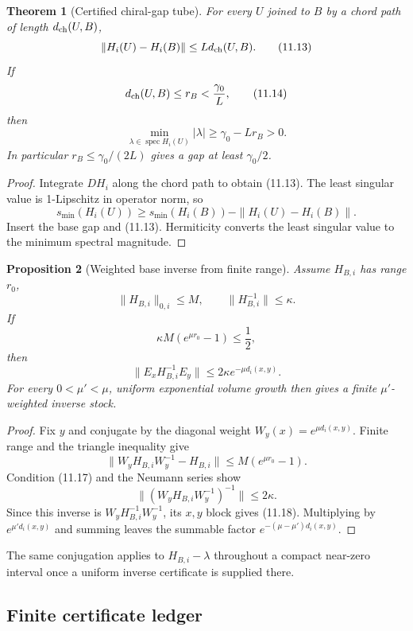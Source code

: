 \documentclass[11pt]{article}
\newtheorem{theorem}{Theorem}[section]
\newtheorem{proposition}[theorem]{Proposition}
\newcommand{\spec}{\operatorname{spec}}
\begin{document}
\begin{theorem}[Certified chiral-gap tube]
\label{thm:v11v11-certified-tube}
For every \(U\) joined to \(B\) by a chord path of length
\(d_{\rm ch}(U,B)\),
\[
 \|H_i(U)-H_i(B)\|
 \leq Ld_{\rm ch}(U,B).
 \tag{11.13}
\]
If
\[
 d_{\rm ch}(U,B)\leq r_B<\frac{\gamma_0}{L},
 \tag{11.14}
\]
then
\[
 \min_{\lambda\in\spec H_i(U)}|\lambda|
 \geq\gamma_0-Lr_B>0.
 \tag{11.15}
\]
In particular \(r_B\leq\gamma_0/(2L)\) gives a gap at least
\(\gamma_0/2\).
\end{theorem}

\begin{proof}
Integrate \(DH_i\) along the chord path to obtain (11.13).
The least singular value is 1-Lipschitz in operator norm, so
\[
 s_{\min}(H_i(U))
 \geq s_{\min}(H_i(B))-\|H_i(U)-H_i(B)\|.
\]
Insert the base gap and (11.13).  Hermiticity converts the least singular
value to the minimum spectral magnitude.
\end{proof}

\begin{proposition}[Weighted base inverse from finite range]
\label{prop:v11v11-combes}
Assume \(H_{B,i}\) has range \(r_0\),
\[
 \|H_{B,i}\|_{0,i}\leq M,
 \qquad
 \|H_{B,i}^{-1}\|\leq\kappa.
 \tag{11.16}
\]
If
\[
 \kappa M(e^{\mu r_0}-1)\leq\frac12,
 \tag{11.17}
\]
then
\[
 \|E_xH_{B,i}^{-1}E_y\|
 \leq2\kappa e^{-\mu d_i(x,y)}.
 \tag{11.18}
\]
For every \(0<\mu'<\mu\), uniform exponential volume growth then gives a
finite \(\mu'\)-weighted inverse stock.
\end{proposition}

\begin{proof}
Fix \(y\) and conjugate by the diagonal weight
\(W_y(x)=e^{\mu d_i(x,y)}\).  Finite range and the triangle inequality
give
\[
 \|W_yH_{B,i}W_y^{-1}-H_{B,i}\|
 \leq M(e^{\mu r_0}-1).
\]
Condition (11.17) and the Neumann series show
\[
 \|(W_yH_{B,i}W_y^{-1})^{-1}\|\leq2\kappa.
\]
Since this inverse is \(W_yH_{B,i}^{-1}W_y^{-1}\), its \(x,y\) block gives
(11.18).  Multiplying by \(e^{\mu'd_i(x,y)}\) and summing leaves the
summable factor \(e^{-(\mu-\mu')d_i(x,y)}\).
\end{proof}

The same conjugation applies to \(H_{B,i}-\lambda\) throughout a compact
near-zero interval once a uniform inverse certificate is supplied there.

\subsection{Finite certificate ledger}
\end{document}
